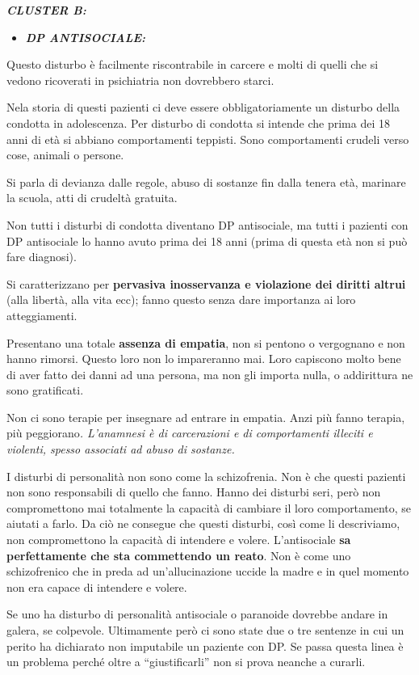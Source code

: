 \documentclass[]{article}
\begin{document}
\textbf{\emph{CLUSTER B:}}

\begin{itemize}
\item
  \textbf{\emph{DP ANTISOCIALE:}}
\end{itemize}

Questo disturbo è facilmente riscontrabile in carcere e molti di quelli
che si vedono ricoverati in psichiatria non dovrebbero starci.

Nela storia di questi pazienti ci deve essere obbligatoriamente un
disturbo della condotta in adolescenza. Per disturbo di condotta si
intende che prima dei 18 anni di età si abbiano comportamenti teppisti.
Sono comportamenti crudeli verso cose, animali o persone.

Si parla di devianza dalle regole, abuso di sostanze fin dalla tenera
età, marinare la scuola, atti di crudeltà gratuita.

Non tutti i disturbi di condotta diventano DP antisociale, ma tutti i
pazienti con DP antisociale lo hanno avuto prima dei 18 anni (prima di
questa età non si può fare diagnosi).

Si caratterizzano per \textbf{pervasiva inosservanza e violazione dei
diritti altrui} (alla libertà, alla vita ecc); fanno questo senza dare
importanza ai loro atteggiamenti.

Presentano una totale \textbf{assenza di empatia}, non si pentono o
vergognano e non hanno rimorsi. Questo loro non lo impareranno mai. Loro
capiscono molto bene di aver fatto dei danni ad una persona, ma non gli
importa nulla, o addirittura ne sono gratificati.

Non ci sono terapie per insegnare ad entrare in empatia. Anzi più fanno
terapia, più peggiorano\emph{. \emph{L'anamnesi è di carcerazioni e di
comportamenti illeciti e violenti, spesso associati ad abuso di
sostanze.}}

I disturbi di personalità non sono come la schizofrenia. Non è che
questi pazienti non sono responsabili di quello che fanno. Hanno dei
disturbi seri, però non compromettono mai totalmente la capacità di
cambiare il loro comportamento, se aiutati a farlo. Da ciò ne consegue
che questi disturbi, così come li descriviamo, non compromettono la
capacità di intendere e volere. L'antisociale \textbf{sa perfettamente
che sta commettendo un reato}. Non è come uno schizofrenico che in preda
ad un'allucinazione uccide la madre e in quel momento non era capace di
intendere e volere.

Se uno ha disturbo di personalità antisociale o paranoide dovrebbe
andare in galera, se colpevole. Ultimamente però ci sono state due o tre
sentenze in cui un perito ha dichiarato non imputabile un paziente con
DP. Se passa questa linea è un problema perché oltre a ``giustificarli''
non si prova neanche a curarli.
\end{document}
